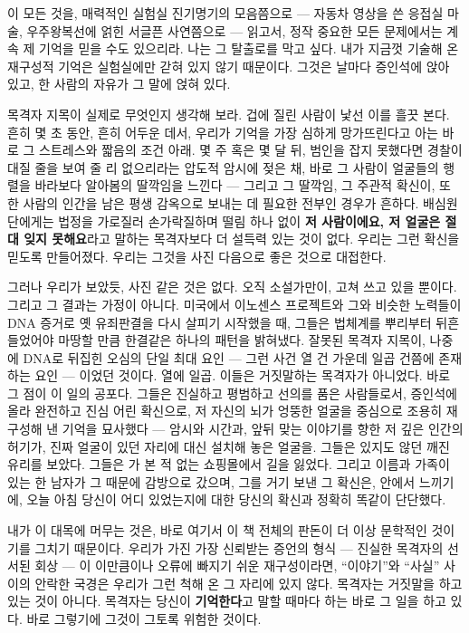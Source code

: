 이 모든 것을, 매력적인 실험실 진기명기의 모음쯤으로 — 자동차 영상을 쓴 응접실 마술, 우주왕복선에 얽힌 서글픈 사연쯤으로 — 읽고서, 정작 중요한 모든 문제에서는 계속 제 기억을 믿을 수도 있으리라. 나는 그 탈출로를 막고 싶다. 내가 지금껏 기술해 온 재구성적 기억은 실험실에만 갇혀 있지 않기 때문이다. 그것은 날마다 증인석에 앉아 있고, 한 사람의 자유가 그 말에 얹혀 있다.

목격자 지목이 실제로 무엇인지 생각해 보라. 겁에 질린 사람이 낯선 이를 흘끗 본다. 흔히 몇 초 동안, 흔히 어두운 데서, 우리가 기억을 가장 심하게 망가뜨린다고 아는 바로 그 스트레스와 짧음의 조건 아래. 몇 주 혹은 몇 달 뒤, 범인을 잡지 못했다면 경찰이 대질 줄을 보여 줄 리 없으리라는 압도적 암시에 젖은 채, 바로 그 사람이 얼굴들의 행렬을 바라보다 알아봄의 딸깍임을 느낀다 — 그리고 그 딸깍임, 그 주관적 확신이, 또 한 사람의 인간을 남은 평생 감옥으로 보내는 데 필요한 전부인 경우가 흔하다. 배심원단에게는 법정을 가로질러 손가락질하며 떨림 하나 없이 \textbf{저 사람이에요, 저 얼굴은 절대 잊지 못해요}라고 말하는 목격자보다 더 설득력 있는 것이 없다. 우리는 그런 확신을 믿도록 만들어졌다. 우리는 그것을 사진 다음으로 좋은 것으로 대접한다.

그러나 우리가 보았듯, 사진 같은 것은 없다. 오직 소설가만이, 고쳐 쓰고 있을 뿐이다. 그리고 그 결과는 가정이 아니다. 미국에서 이노센스 프로젝트와 그와 비슷한 노력들이 DNA 증거로 옛 유죄판결을 다시 살피기 시작했을 때, 그들은 법체계를 뿌리부터 뒤흔들었어야 마땅할 만큼 한결같은 하나의 패턴을 밝혀냈다. 잘못된 목격자 지목이, 나중에 DNA로 뒤집힌 오심의 단일 최대 요인 — 그런 사건 열 건 가운데 일곱 건쯤에 존재하는 요인 — 이었던 것이다. 열에 일곱. 이들은 거짓말하는 목격자가 아니었다. 바로 그 점이 이 일의 공포다. 그들은 진실하고 평범하고 선의를 품은 사람들로서, 증인석에 올라 완전하고 진심 어린 확신으로, 저 자신의 뇌가 엉뚱한 얼굴을 중심으로 조용히 재구성해 낸 기억을 묘사했다 — 암시와 시간과, 앞뒤 맞는 이야기를 향한 저 깊은 인간의 허기가, 진짜 얼굴이 있던 자리에 대신 설치해 놓은 얼굴을. 그들은 있지도 않던 깨진 유리를 보았다. 그들은 가 본 적 없는 쇼핑몰에서 길을 잃었다. 그리고 이름과 가족이 있는 한 남자가 그 때문에 감방으로 갔으며, 그를 거기 보낸 그 확신은, 안에서 느끼기에, 오늘 아침 당신이 어디 있었는지에 대한 당신의 확신과 정확히 똑같이 단단했다.

내가 이 대목에 머무는 것은, 바로 여기서 이 책 전체의 판돈이 더 이상 문학적인 것이기를 그치기 때문이다. 우리가 가진 가장 신뢰받는 증언의 형식 — 진실한 목격자의 선서된 회상 — 이 이만큼이나 오류에 빠지기 쉬운 재구성이라면, ``이야기''와 ``사실'' 사이의 안락한 국경은 우리가 그런 척해 온 그 자리에 있지 않다. 목격자는 거짓말을 하고 있는 것이 아니다. 목격자는 당신이 \textbf{기억한다}고 말할 때마다 하는 바로 그 일을 하고 있다. 바로 그렇기에 그것이 그토록 위험한 것이다.

